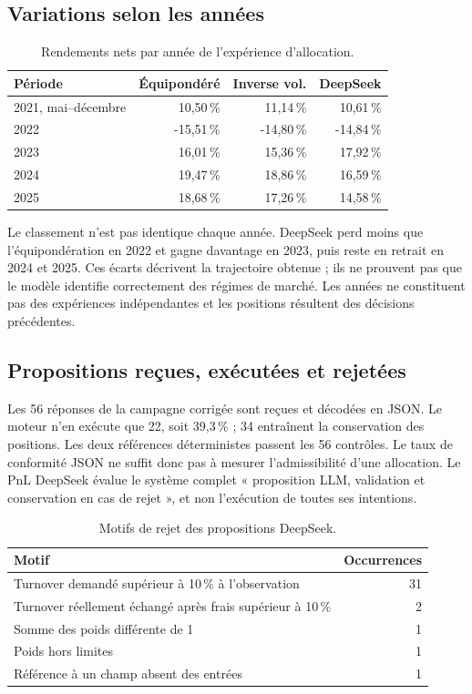 \subsection{Variations selon les années}

\begin{table}[H]
\centering
\caption{Rendements nets par année de l'expérience d'allocation.}
\label{tab:allocation-annuel}
\small
\begin{tabular}{lrrr}
\toprule
\textbf{Période} & \textbf{Équipondéré} & \textbf{Inverse vol.} & \textbf{DeepSeek} \\
\midrule
2021, mai--décembre & 10,50\,\% & 11,14\,\% & 10,61\,\% \\
2022 & -15,51\,\% & -14,80\,\% & -14,84\,\% \\
2023 & 16,01\,\% & 15,36\,\% & 17,92\,\% \\
2024 & 19,47\,\% & 18,86\,\% & 16,59\,\% \\
2025 & 18,68\,\% & 17,26\,\% & 14,58\,\% \\
\bottomrule
\end{tabular}
\end{table}

Le classement n'est pas identique chaque année. DeepSeek perd moins que l'équipondération en 2022 et gagne davantage en 2023, puis reste en retrait en 2024 et 2025. Ces écarts décrivent la trajectoire obtenue ; ils ne prouvent pas que le modèle identifie correctement des régimes de marché. Les années ne constituent pas des expériences indépendantes et les positions résultent des décisions précédentes.

\subsection{Propositions reçues, exécutées et rejetées}

Les 56 réponses de la campagne corrigée sont reçues et décodées en JSON. Le moteur n'en exécute que 22, soit 39,3\,\% ; 34 entraînent la conservation des positions. Les deux références déterministes passent les 56 contrôles. Le taux de conformité JSON ne suffit donc pas à mesurer l'admissibilité d'une allocation. Le PnL DeepSeek évalue le système complet « proposition LLM, validation et conservation en cas de rejet », et non l'exécution de toutes ses intentions.

\begin{table}[H]
\centering
\caption{Motifs de rejet des propositions DeepSeek.}
\label{tab:allocation-rejets}
\small
\begin{tabular}{p{}r}
\toprule
\textbf{Motif} & \textbf{Occurrences} \\
\midrule
Turnover demandé supérieur à 10\,\% à l'observation & 31 \\
Turnover réellement échangé après frais supérieur à 10\,\% & 2 \\
Somme des poids différente de 1 & 1 \\
Poids hors limites & 1 \\
Référence à un champ absent des entrées & 1 \\
\bottomrule
\end{tabular}
\end{table}

